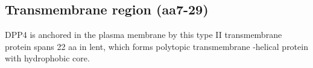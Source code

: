 \subsection{Transmembrane region (aa7-29)}

DPP4 is anchored in the plasma membrane by this type II transmembrane protein spans 22 aa in lent, which forms polytopic transmembrane \alpha-helical protein with hydrophobic core.~\cite{Hong_1990}